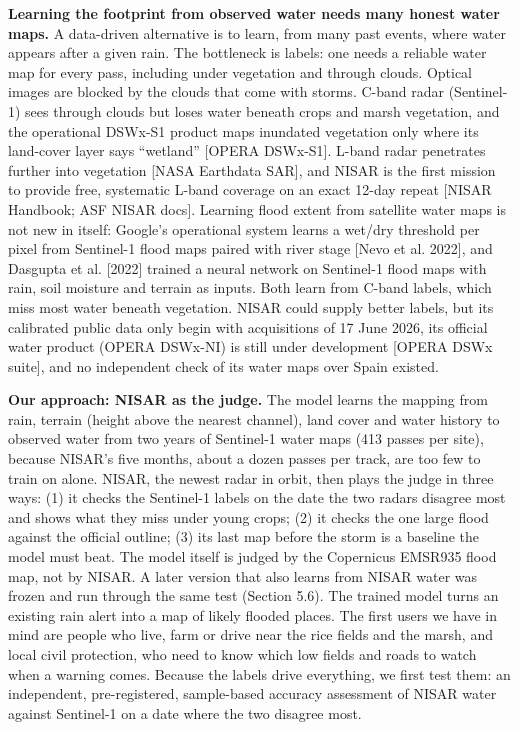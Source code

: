 \documentclass[10pt,twocolumn]{article}
\begin{document}
\textbf{Learning the footprint from observed water needs many honest water maps.} A data-driven alternative is to learn, from many past events, where water appears after a given rain. The bottleneck is labels: one needs a reliable water map for every pass, including under vegetation and through clouds. Optical images are blocked by the clouds that come with storms. C-band radar (Sentinel-1) sees through clouds but loses water beneath crops and marsh vegetation, and the operational DSWx-S1 product maps inundated vegetation only where its land-cover layer says ``wetland'' [OPERA DSWx-S1]. L-band radar penetrates further into vegetation [NASA Earthdata SAR], and NISAR is the first mission to provide free, systematic L-band coverage on an exact 12-day repeat [NISAR Handbook; ASF NISAR docs]. Learning flood extent from satellite water maps is not new in itself: Google's operational system learns a wet/dry threshold per pixel from Sentinel-1 flood maps paired with river stage [Nevo et al. 2022], and Dasgupta et al. [2022] trained a neural network on Sentinel-1 flood maps with rain, soil moisture and terrain as inputs. Both learn from C-band labels, which miss most water beneath vegetation. NISAR could supply better labels, but its calibrated public data only begin with acquisitions of 17 June 2026, its official water product (OPERA DSWx-NI) is still under development [OPERA DSWx suite], and no independent check of its water maps over Spain existed.

\textbf{Our approach: NISAR as the judge.} The model learns the mapping from rain, terrain (height above the nearest channel), land cover and water history to observed water from two years of Sentinel-1 water maps (413 passes per site), because NISAR's five months, about a dozen passes per track, are too few to train on alone. NISAR, the newest radar in orbit, then plays the judge in three ways: (1) it checks the Sentinel-1 labels on the date the two radars disagree most and shows what they miss under young crops; (2) it checks the one large flood against the official outline; (3) its last map before the storm is a baseline the model must beat. The model itself is judged by the Copernicus EMSR935 flood map, not by NISAR. A later version that also learns from NISAR water was frozen and run through the same test (Section 5.6). The trained model turns an existing rain alert into a map of likely flooded places. The first users we have in mind are people who live, farm or drive near the rice fields and the marsh, and local civil protection, who need to know which low fields and roads to watch when a warning comes. Because the labels drive everything, we first test them: an independent, pre-registered, sample-based accuracy assessment of NISAR water against Sentinel-1 on a date where the two disagree most.
\end{document}
